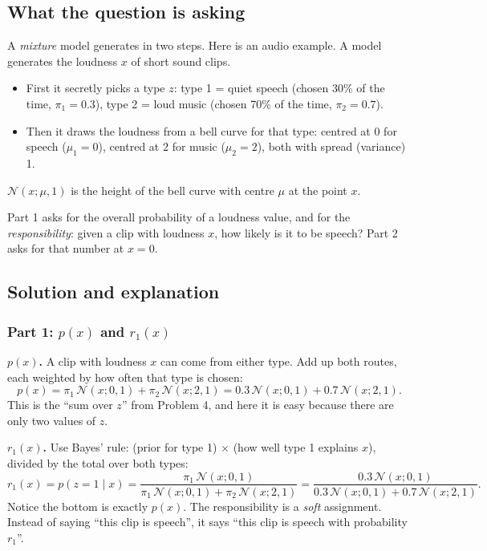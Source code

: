 \documentclass[12pt,a4paper]{article}
\begin{document}
\subsection{What the question is asking}

A \emph{mixture} model generates in two steps. Here is an audio example. A model generates the loudness $x$ of short sound clips.
\begin{itemize}[leftmargin=*]
\item First it secretly picks a type $z$: type 1 = quiet speech (chosen 30\% of the time, $\pi_1 = 0.3$), type 2 = loud music (chosen 70\% of the time, $\pi_2 = 0.7$).
\item Then it draws the loudness from a bell curve for that type: centred at $0$ for speech ($\mu_1 = 0$), centred at $2$ for music ($\mu_2 = 2$), both with spread (variance) 1.
\end{itemize}
$\mathcal{N}(x;\mu,1)$ is the height of the bell curve with centre $\mu$ at the point $x$.

Part 1 asks for the overall probability of a loudness value, and for the \emph{responsibility}: given a clip with loudness $x$, how likely is it to be speech? Part 2 asks for that number at $x = 0$.

\subsection{Solution and explanation}

\subsubsection{Part 1: $p(x)$ and $r_1(x)$}

\textbf{$p(x)$.} A clip with loudness $x$ can come from either type. Add up both routes, each weighted by how often that type is chosen:
\[
p(x) = \pi_1\,\mathcal{N}(x; 0, 1) + \pi_2\,\mathcal{N}(x; 2, 1) = 0.3\,\mathcal{N}(x; 0, 1) + 0.7\,\mathcal{N}(x; 2, 1).
\]
This is the ``sum over $z$'' from Problem 4, and here it is easy because there are only two values of $z$.

\textbf{$r_1(x)$.} Use Bayes' rule: (prior for type 1) $\times$ (how well type 1 explains $x$), divided by the total over both types:
\[
r_1(x) = p(z = 1 \mid x) = \frac{\pi_1\,\mathcal{N}(x; 0, 1)}{\pi_1\,\mathcal{N}(x; 0, 1) + \pi_2\,\mathcal{N}(x; 2, 1)} = \frac{0.3\,\mathcal{N}(x; 0, 1)}{0.3\,\mathcal{N}(x; 0, 1) + 0.7\,\mathcal{N}(x; 2, 1)}.
\]
Notice the bottom is exactly $p(x)$. The responsibility is a \emph{soft} assignment. Instead of saying ``this clip is speech'', it says ``this clip is speech with probability $r_1$''.
\end{document}
